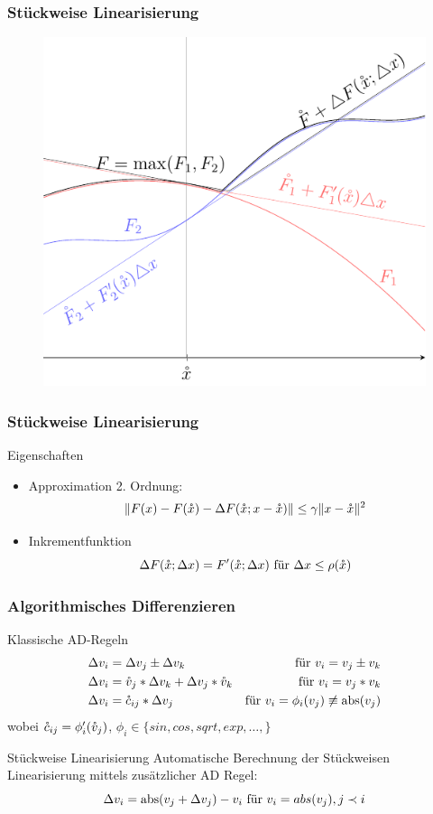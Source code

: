 \begin{frame}[<+->]
\frametitle{Stückweise Linearisierung}
\begin{figure}
\centering
\includegraphics[width=0.65\linewidth]{../dipl_tex/img/tikz/piecewise_linearization.pdf}
\end{figure}
\end{frame}

\begin{frame}[<+->]
\frametitle{Stückweise Linearisierung}
\begin{block}{Eigenschaften}
 \begin{itemize}
  \item Approximation 2. Ordnung: \[\|F(x) - F(\mathring{x})- \Delta F(\mathring{x};x-\mathring{x})\| \leq \gamma \|x-\mathring{x}\|^2\]
  \item Inkrementfunktion 
    \[\Delta F(\mathring{x};\Delta x) = F'(\mathring{x};\Delta x)~ \text{für } \Delta x \leq \rho(\mathring{x})\]
  
 \end{itemize}
\end{block}
\end{frame}

\begin{frame}[<+->]
\frametitle{Algorithmisches Differenzieren}
\begin{block}{Klassische AD-Regeln}
\[
  \begin{aligned}
    \Delta v_i &= \Delta v_j \pm \Delta v_k & \text{für } v_i = v_j \pm v_k\\
    \Delta v_i &= \mathring{v}_j* \Delta v_k +\Delta v_j*\mathring{v}_k& \text{für } v_i = v_j * v_k\\
    \Delta v_i &= \mathring c_{ij} * \Delta v_j  & \text{für } v_i = \phi_i(v_j) \not \equiv \operatorname{abs}(v_j)
  \end{aligned}
\]
wobei $\mathring c_{ij} = \phi'_i(\mathring{v}_j)$, $\phi_i \in \lbrace sin, cos, sqrt, exp, \ldots,\rbrace$
\end{block}
 \begin{block}{Stückweise Linearisierung}
 Automatische Berechnung der Stückweisen Linearisierung mittels zusätzlicher AD Regel:
 \[
    \Delta v_i =\operatorname{abs}(v_j + \Delta v_j) - v_i \text{ für } v_i = abs(v_j), j\prec i
 \]
\end{block}
\end{frame}
